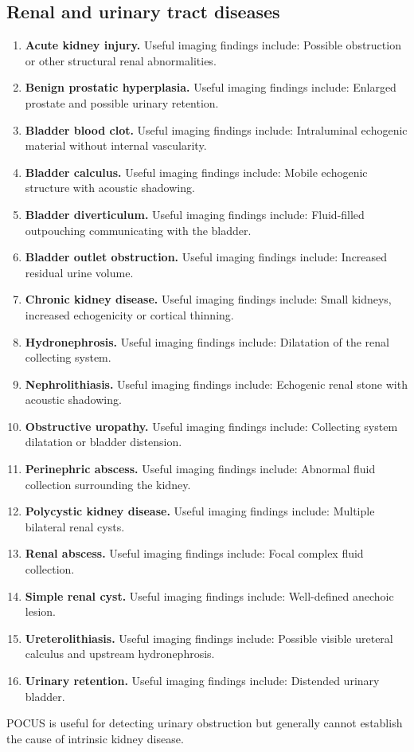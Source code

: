 \subsection{Renal and urinary tract diseases}
\begin{enumerate}[leftmargin=*,itemsep=0.45em,topsep=0.4em]
\item \textbf{Acute kidney injury.} Useful imaging findings include: Possible obstruction or other structural renal abnormalities.
\item \textbf{Benign prostatic hyperplasia.} Useful imaging findings include: Enlarged prostate and possible urinary retention.
\item \textbf{Bladder blood clot.} Useful imaging findings include: Intraluminal echogenic material without internal vascularity.
\item \textbf{Bladder calculus.} Useful imaging findings include: Mobile echogenic structure with acoustic shadowing.
\item \textbf{Bladder diverticulum.} Useful imaging findings include: Fluid-filled outpouching communicating with the bladder.
\item \textbf{Bladder outlet obstruction.} Useful imaging findings include: Increased residual urine volume.
\item \textbf{Chronic kidney disease.} Useful imaging findings include: Small kidneys, increased echogenicity or cortical thinning.
\item \textbf{Hydronephrosis.} Useful imaging findings include: Dilatation of the renal collecting system.
\item \textbf{Nephrolithiasis.} Useful imaging findings include: Echogenic renal stone with acoustic shadowing.
\item \textbf{Obstructive uropathy.} Useful imaging findings include: Collecting system dilatation or bladder distension.
\item \textbf{Perinephric abscess.} Useful imaging findings include: Abnormal fluid collection surrounding the kidney.
\item \textbf{Polycystic kidney disease.} Useful imaging findings include: Multiple bilateral renal cysts.
\item \textbf{Renal abscess.} Useful imaging findings include: Focal complex fluid collection.
\item \textbf{Simple renal cyst.} Useful imaging findings include: Well-defined anechoic lesion.
\item \textbf{Ureterolithiasis.} Useful imaging findings include: Possible visible ureteral calculus and upstream hydronephrosis.
\item \textbf{Urinary retention.} Useful imaging findings include: Distended urinary bladder.
\end{enumerate}
POCUS is useful for detecting urinary obstruction but generally cannot establish the cause of intrinsic kidney disease.

